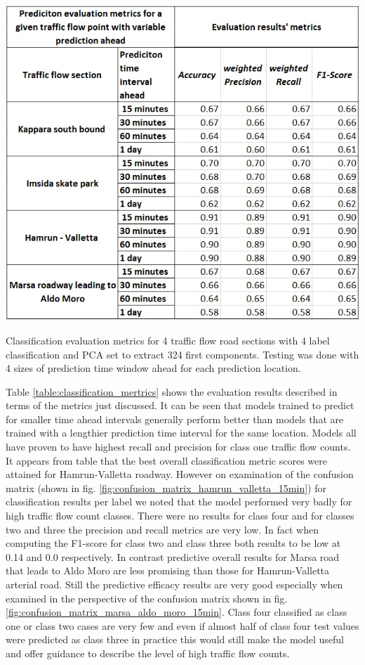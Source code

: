 \documentclass[12pt, a4paper]{report}
\theoremstyle{definition}
\theoremstyle{definition}%
\theoremstyle{definition}%
\theoremstyle{definition}%
\theoremstyle{definition}%
\theoremstyle{definition}%
\begin{document}
\begin{table}[t!]	
	\includegraphics[scale=0.75]{classification_metrics_result.jpg}
	\centering
	\caption[Classification evaluation metrics for traffic flow prediction]{Classification evaluation metrics for 4 traffic flow road sections with 4 label classification and PCA set to extract 324 first components. Testing was done with 4 sizes of prediction time window ahead for each prediction location.}
	\label{table:classification_mertrics}
\end{table}

Table \ref{table:classification_mertrics} shows the evaluation results described in terms of the metrics just discussed. It can be seen that models trained to predict for smaller time ahead intervals generally perform better than models that are trained with a lengthier prediction time interval for the same location.  Models all have proven to have highest recall and precision for class one traffic flow counts. It appears from table that the best overall classification metric scores were attained for Hamrun-Valletta roadway. However on examination of the confusion matrix (shown in fig. \ref{fig:confusion_matrix_hamrun_valletta_15min}) for classification results per label we noted that the model performed very badly for high traffic flow count classes. There were no results for class four and for classes two and three the precision and recall metrics are very low. In fact when computing the F1-score for class two and class three both results to be low at 0.14 and 0.0 respectively. In contrast predictive overall results for Marsa road that leads to Aldo Moro are less promising than those for Hamrun-Valletta arterial road. Still the predictive efficacy results are very good especially when examined in the perspective of the confusion matrix shown in fig. \ref{fig:confusion_matrix_marsa_aldo_moro_15min}. Class four classified as class one or class two cases are very few and even if almost half of class four test values were predicted as class three in practice this would still make the model useful and offer guidance to describe the level of high traffic flow counts.
\end{document}
